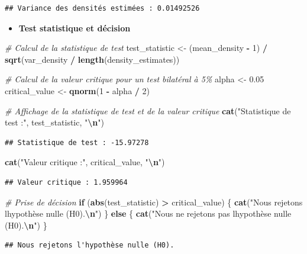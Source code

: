 \documentclass[
  12pt,
]{article}
\newenvironment{Shaded}{\begin{snugshade}}{\end{snugshade}}
\newcommand{\CommentTok}[1]{\textcolor[rgb]{0.56,0.35,0.01}{\textit{#1}}}
\newcommand{\ControlFlowTok}[1]{\textcolor[rgb]{0.13,0.29,0.53}{\textbf{#1}}}
\newcommand{\DecValTok}[1]{\textcolor[rgb]{0.00,0.00,0.81}{#1}}
\newcommand{\FloatTok}[1]{\textcolor[rgb]{0.00,0.00,0.81}{#1}}
\newcommand{\FunctionTok}[1]{\textcolor[rgb]{0.13,0.29,0.53}{\textbf{#1}}}
\newcommand{\NormalTok}[1]{#1}
\newcommand{\OtherTok}[1]{\textcolor[rgb]{0.56,0.35,0.01}{#1}}
\newcommand{\SpecialCharTok}[1]{\textcolor[rgb]{0.81,0.36,0.00}{\textbf{#1}}}
\newcommand{\StringTok}[1]{\textcolor[rgb]{0.31,0.60,0.02}{#1}}
\providecommand{\tightlist}{%
  \setlength{\itemsep}{0pt}\setlength{\parskip}{0pt}}
\begin{document}
\begin{verbatim}
## Variance des densités estimées : 0.01492526
\end{verbatim}

\begin{itemize}
\tightlist
\item
  \textbf{Test statistique et décision}
\end{itemize}

\begin{Shaded}
\begin{Highlighting}[]
\CommentTok{\# Calcul de la statistique de test}
\NormalTok{test\_statistic }\OtherTok{\textless{}{-}}\NormalTok{ (mean\_density }\SpecialCharTok{{-}} \DecValTok{1}\NormalTok{) }\SpecialCharTok{/} \FunctionTok{sqrt}\NormalTok{(var\_density }\SpecialCharTok{/} \FunctionTok{length}\NormalTok{(density\_estimates))}

\CommentTok{\# Calcul de la valeur critique pour un test bilatéral à 5\%}
\NormalTok{alpha }\OtherTok{\textless{}{-}} \FloatTok{0.05}
\NormalTok{critical\_value }\OtherTok{\textless{}{-}} \FunctionTok{qnorm}\NormalTok{(}\DecValTok{1} \SpecialCharTok{{-}}\NormalTok{ alpha }\SpecialCharTok{/} \DecValTok{2}\NormalTok{)}

\CommentTok{\# Affichage de la statistique de test et de la valeur critique}
\FunctionTok{cat}\NormalTok{(}\StringTok{"Statistique de test :"}\NormalTok{, test\_statistic, }\StringTok{"}\SpecialCharTok{\textbackslash{}n}\StringTok{"}\NormalTok{)}
\end{Highlighting}
\end{Shaded}

\begin{verbatim}
## Statistique de test : -15.97278
\end{verbatim}

\begin{Shaded}
\begin{Highlighting}[]
\FunctionTok{cat}\NormalTok{(}\StringTok{"Valeur critique :"}\NormalTok{, critical\_value, }\StringTok{"}\SpecialCharTok{\textbackslash{}n}\StringTok{"}\NormalTok{)}
\end{Highlighting}
\end{Shaded}

\begin{verbatim}
## Valeur critique : 1.959964
\end{verbatim}

\begin{Shaded}
\begin{Highlighting}[]
\CommentTok{\# Prise de décision}
\ControlFlowTok{if}\NormalTok{ (}\FunctionTok{abs}\NormalTok{(test\_statistic) }\SpecialCharTok{\textgreater{}}\NormalTok{ critical\_value) \{}
  \FunctionTok{cat}\NormalTok{(}\StringTok{"Nous rejetons l\textquotesingle{}hypothèse nulle (H0).}\SpecialCharTok{\textbackslash{}n}\StringTok{"}\NormalTok{)}
\NormalTok{\} }\ControlFlowTok{else}\NormalTok{ \{}
  \FunctionTok{cat}\NormalTok{(}\StringTok{"Nous ne rejetons pas l\textquotesingle{}hypothèse nulle (H0).}\SpecialCharTok{\textbackslash{}n}\StringTok{"}\NormalTok{)}
\NormalTok{\}}
\end{Highlighting}
\end{Shaded}

\begin{verbatim}
## Nous rejetons l'hypothèse nulle (H0).
\end{verbatim}
\end{document}
